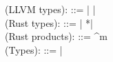 \begin{plstx}
(LLVM types): \tllvm ::=  | \opaqueptr | \overline{\tllvm}\\
(Rust types): \trust ::=  | *\trust | \trustprod \\
(Rust products): \trustprod ::= ^m\\
(Types): \tau ::= \trust | \tllvm\\
\end{plstx}
